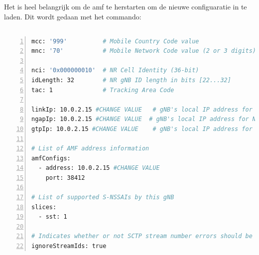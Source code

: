 Het is heel belangrijk om de \gls{amf} te herstarten om de nieuwe configuaratie in te laden. Dit wordt gedaan met het commando: 

\subsection{}%
\label{sec:gnb_config}%

\begin{lstlisting}[basicstyle=\small, frame=single, breaklines=true, postbreak=\mbox{\textcolor{red}{$\hookrightarrow$}\space}, escapeinside ={\%,}, escapechar={!}, numbers=left, language=sh, caption=gnb configuratie]
mcc: '999'          # Mobile Country Code value
mnc: '70'           # Mobile Network Code value (2 or 3 digits)

nci: '0x000000010'  # NR Cell Identity (36-bit)
idLength: 32        # NR gNB ID length in bits [22...32]
tac: 1              # Tracking Area Code

linkIp: 10.0.2.15 #CHANGE VALUE   # gNB's local IP address for Radio Link Simulation (Usually same with local IP)
ngapIp: 10.0.2.15 #CHANGE VALUE  # gNB's local IP address for N2 Interface (Usually same with local IP)
gtpIp: 10.0.2.15 #CHANGE VALUE    # gNB's local IP address for N3 Interface (Usually same with local IP)

# List of AMF address information
amfConfigs:
  - address: 10.0.2.15 #CHANGE VALUE
    port: 38412

# List of supported S-NSSAIs by this gNB
slices:
  - sst: 1

# Indicates whether or not SCTP stream number errors should be ignored.
ignoreStreamIds: true
\end{lstlisting}

\subsection{}%
\label{sec:ue_config}%

